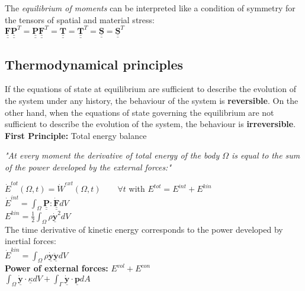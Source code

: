 The \textit{equilibrium of moments } can be interpreted like a condition of symmetry for the tensors of spatial and material stress: \\
$\underline{\underline{\mathbf{F}}}\underline{\underline{\mathbf{P}}}^T = \underline{\underline{\mathbf{P}}}\underline{\underline{\mathbf{F}}}^T = \underline{\underline{\mathbf{T}}} = 
\underline{\underline{\mathbf{T}}}^T = \underline{\underline{\mathbf{S}}} = \underline{\underline{\mathbf{S}}}^T$ 

\subsection*{Thermodynamical principles}
\smallskip
If the equations of state at equilibrium are sufficient to describe the evolution of the system under any history, the behaviour of the system is \textbf{reversible}.
On the other hand, when the equations of state governing the equilibrium are not sufficient to describe the evolution of the system, the behaviour is \textbf{irreversible}. \\

\textbf{First Principle:} Total energy balance

\begin{center}
\emph{"At every moment the derivative of total energy of the body $\Omega$ is equal to the sum of the power developed by the external forces:"}
\end{center}

$\dot{E}^{tot} (\Omega, t) = \dot{W}^{ext} (\Omega, t) \qquad \forall t$ \qquad with $E^{tot} = E^{int} + E^{kin}$ \\
$\dot{E}^{int} = \int_\Omega \underline{\underline{\mathbf{P}}} : \underline{\underline{\mathbf{\dot{F}}}} dV$ \\
$E^{kin} = \frac{1}{2} \int_\Omega \rho \underline{\mathbf{\dot{y}}}^2 dV$ \\

The time derivative of kinetic energy corresponds to the power developed by inertial forces: \\

$\dot{E}^{kin} = \int_\Omega \rho \underline{\mathbf{\dot{y}}} \underline{\mathbf{\ddot{y}}} dV$ \\

\textbf{Power of external forces:} $E^{vol} + E^{con}$\\

$\int_\Omega \underline{\mathbf{\dot{y}}} \cdot \underline{\kappa} dV + \int_\Gamma \underline{\mathbf{\dot{y}}} \cdot \underline{\mathbf{p}}dA$ \\

